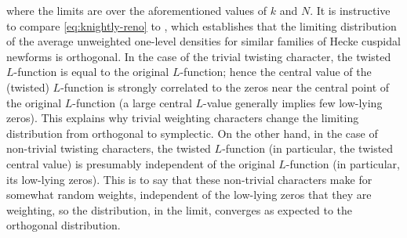 \documentclass[12pt, reqno,oneside]{amsart}
\theoremstyle{plain}
\theoremstyle{definition}
\theoremstyle{remark}
\theoremstyle{plain}
\numberwithin{equation}{section}
\begin{document}
where the limits are over the aforementioned values of $k$ and $N$. It is instructive to compare \eqref{eq:knightly-reno} to \cite[Theorem 1.1]{ILS00}, which establishes that the limiting distribution of the average unweighted one-level densities for similar families of Hecke cuspidal newforms is orthogonal. In the case of the trivial twisting character, the twisted $L$-function is equal to the original $L$-function; hence the central value of the (twisted) $L$-function is strongly correlated to the zeros near the central point of the original $L$-function (a large central $L$-value generally implies few low-lying zeros). This explains why trivial weighting characters change the limiting distribution from orthogonal to symplectic. On the other hand, in the case of non-trivial twisting characters, the twisted $L$-function (in particular, the twisted central value) is presumably independent of the original $L$-function (in particular, its low-lying zeros). This is to say that these non-trivial characters make for somewhat random weights, independent of the low-lying zeros that they are weighting, so the distribution, in the limit, converges as expected to the orthogonal distribution.
\end{document}
